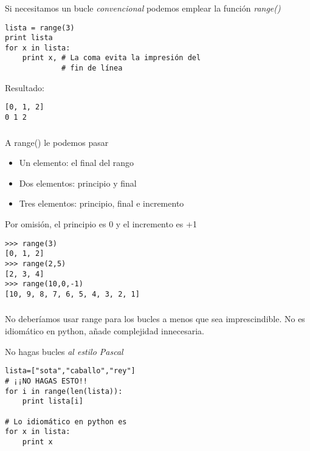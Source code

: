 \documentclass[ucs]{beamer}
\begin{document}
\begin{frame}[fragile]
\frametitle{}
Si necesitamos un bucle \emph{convencional} podemos emplear
la función \emph{range()}

  \begin{footnotesize}
  \begin{verbatim}
lista = range(3)
print lista
for x in lista:
    print x, # La coma evita la impresión del
             # fin de línea
  \end{verbatim}
  \end{footnotesize}

Resultado:

\begin{scriptsize}
\begin{verbatim}
[0, 1, 2]
0 1 2
\end{verbatim}
\end{scriptsize}
\end{frame}


\begin{frame}[fragile]
\frametitle{}
A range() le podemos pasar

\begin{itemize}
\item
Un elemento: el final del rango
\item
Dos elementos: principio y final
\item
Tres elementos: principio, final e incremento
\end{itemize}
Por omisión, el principio es 0 y el incremento es +1

  \begin{footnotesize}
  \begin{verbatim}
>>> range(3)
[0, 1, 2]
>>> range(2,5)
[2, 3, 4]
>>> range(10,0,-1)
[10, 9, 8, 7, 6, 5, 4, 3, 2, 1]
  \end{verbatim}
  \end{footnotesize}

\end{frame}



\begin{frame}[fragile]
\frametitle{}
No deberíamos usar range para los bucles a menos que sea imprescindible.
No es idiomático en python, añade complejidad innecesaria.

No hagas bucles \emph{al estilo Pascal}


  \begin{footnotesize}
  \begin{center}
  \end{center}
  \begin{verbatim}
lista=["sota","caballo","rey"]
# ¡¡NO HAGAS ESTO!!
for i in range(len(lista)):
    print lista[i]

# Lo idiomático en python es
for x in lista:
    print x
  \end{verbatim}
  \end{footnotesize}

\end{frame}
\end{document}
